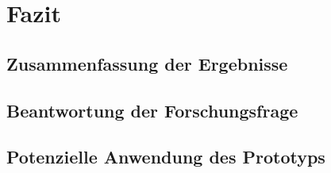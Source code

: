 \chapter{Fazit}

\section{Zusammenfassung der Ergebnisse}

\section{Beantwortung der Forschungsfrage}

\section{Potenzielle Anwendung des Prototyps}